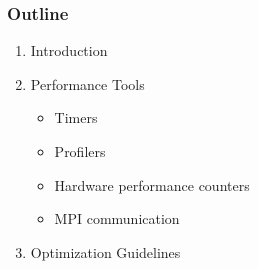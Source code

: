 \begin{frame}
\frametitle{Outline}
\begin{enumerate}
\item Introduction
\item Performance Tools
\begin{itemize}
\item Timers
\item Profilers
\item Hardware performance counters
\item MPI communication
\end{itemize}
\item Optimization Guidelines
\end{enumerate}
\end{frame}
